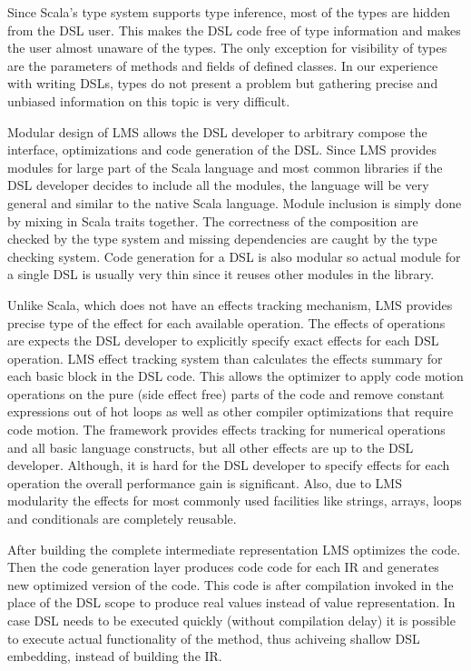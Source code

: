 Since Scala's type system supports type inference, most of the  types are hidden from the DSL user. This makes the DSL code free of type information and makes the user almost unaware of the  types. The only exception for visibility of  types are the parameters of methods and fields of defined classes. In our experience with writing DSLs,  types do not present a problem but gathering precise and unbiased information on this topic is very difficult.  

Modular design of LMS allows the DSL developer to arbitrary compose the interface, optimizations and code generation of the DSL. Since LMS provides modules for large part of the Scala language and most common libraries if the DSL developer decides to include all the modules, the language will be very general and similar to the native Scala language. Module inclusion is simply done by mixing in Scala traits together. The correctness of the composition are checked by the type system and missing dependencies are caught by the type checking system. Code generation for a DSL is also modular so actual module for a single DSL is usually very thin since it reuses other modules in the library.

Unlike Scala, which does not have an effects tracking mechanism, LMS provides precise type of the effect for each available operation. The effects of operations are expects the DSL developer to explicitly specify exact effects for each DSL operation. LMS effect tracking system than calculates the effects summary for each basic block in the DSL code. This allows the optimizer to apply code motion operations on the pure (side effect free) parts of the code and remove constant expressions out of hot loops as well as other compiler optimizations that require code motion. The framework provides effects tracking for numerical operations and all basic language constructs, but all other effects are up to the DSL developer. Although, it is hard for the DSL developer to specify effects for each operation the overall performance gain is significant. Also, due to LMS modularity the effects for most commonly used facilities like strings, arrays, loops and conditionals are completely reusable. 

After building the complete intermediate representation LMS optimizes the code. Then the code generation layer produces code code for each IR and generates new optimized version of the code. This code is after compilation invoked in the place of the DSL scope to produce real values instead of value representation. In case DSL needs to be executed quickly (without compilation delay) it is possible to execute actual functionality of the method, thus achiveing shallow DSL embedding, instead of building the IR. 
 
